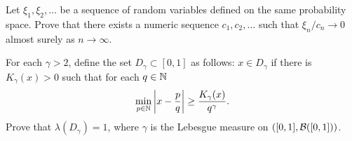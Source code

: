 \begin{problem}{3}
    Let $\xi_1, \xi_2,\ldots$ be a sequence of random variables defined on the same probability space. Prove that there exists a numeric sequence $c_1,c_2,\ldots$ such that $\xi_n/c_n \to 0$ almost surely as $n\to\infty$.
\end{problem}
\begin{solution}
    
\end{solution}

\begin{problem}{4}
    For each $\gamma > 2$, define the set $D_\gamma \subset [0,1]$ as follows: $x \in D_\gamma$ if there is $K_\gamma(x) > 0$ such that for each $q \in \mathbb{N}$
    \[
        \min_{p \in\mathbb{N}} \left|x - \frac{p}{q}\right|  \geq \frac{K_\gamma(x)}{q^\gamma}.
    \]
    Prove that $\lambda(D_\gamma) =1$, where $\gamma$ is the Lebesgue measure on $([0,1], \mathcal{B}([0,1]))$.
\end{problem}
\begin{solution}
    
\end{solution}